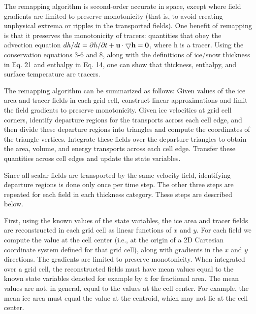 The remapping algorithm is second-order accurate in space, except where 
field gradients are limited to preserve monotonicity (that is, to avoid 
creating unphysical extrema or ripples in the transported fields).  One 
benefit of remapping is that it preserves the monotonicity of tracers: 
quantities that obey the advection equation $ dh/dt = \partial h / \partial t 
+ \bf{u} \cdot \bigtriangledown h = 0$, where h is a tracer.  Using the 
conservation equations 3-6 and 8, along with the definitions of ice/snow 
thickness in Eq. 21 and enthalpy in Eq. 14, one can show that thickness, 
enthalpy, and surface temperature are tracers.

The remapping algorithm can be summarized as follows: 
Given values of the ice area and tracer fields in each grid cell, construct 
linear approximations and limit the field gradients to preserve 
monotonicity. Given ice velocities at grid cell corners, identify departure
regions for the transports across each cell edge, and then divide these departure 
regions into triangles and compute the coordinates of the triangle vertices. 
Integrate these fields over the departure triangles to obtain the area, 
volume, and energy transports across each cell edge. Transfer these quantities
across cell edges and update the state variables.

Since all scalar fields are transported by the same velocity field, 
identifying departure regions is done only once per time step. The other 
three steps are repeated for each field in each thickness category. These 
steps are described below.

\vskip 10pt

First, using the known values of the state variables, the ice area and tracer 
fields are reconstructed in each grid cell as linear functions of $x$ and $y$. 
For each field we compute the value at the cell center (i.e., at the origin 
of a 2D Cartesian coordinate system defined for that grid cell), along with 
gradients in the $x$ and $y$ directions. The gradients are limited to preserve
monotonicity. When integrated over a grid cell, the reconstructed fields must 
have mean values equal to the known state variables denoted for example by 
$\bar{a}$ for fractional area. The mean values are not, in general, equal to 
the values at the cell center. For example, the mean ice area must equal the 
value at the centroid, which may not lie at the cell center. 

